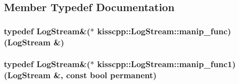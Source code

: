 \subsection{Member Typedef Documentation}
\hypertarget{a00031_abb058ef2b1b57fb7e0b89c3312794ada}{
\subsubsection[{manip\-\_\-func}]{\setlength{\rightskip}{0pt plus 5cm}typedef {\bf Log\-Stream}\&($\ast$ kisscpp\-::\-Log\-Stream\-::manip\-\_\-func)({\bf Log\-Stream} \&)}}\label{a00031_abb058ef2b1b57fb7e0b89c3312794ada}
\hypertarget{a00031_ab6994c757d4c63c4388a932cf2be2c9d}{
\subsubsection[{manip\-\_\-func1}]{\setlength{\rightskip}{0pt plus 5cm}typedef {\bf Log\-Stream}\&($\ast$ kisscpp\-::\-Log\-Stream\-::manip\-\_\-func1)({\bf Log\-Stream} \&, const bool permanent)}}\label{a00031_ab6994c757d4c63c4388a932cf2be2c9d}


